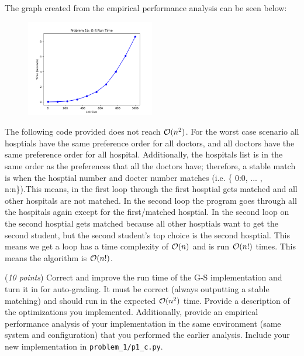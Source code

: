\documentclass{hw}
\begin{document}
\begin{problem}
\begin{solution}
        The graph created from the empirical performance analysis can be seen below:
        \begin{figure}[h]
          \centering
              \includegraphics[width=0.5\textwidth]{figures/problem-1b.png}
        \end{figure}



        The following code provided does not reach $\mathcal{O}(n^2)$. For the worst case scenario all hosptials have the same preference order for all doctors, and all doctors have the same preference order for all hospital. Additionally, the hospitals list is in the same order as the preferences that all the doctors have; therefore, a stable match is when the hosptial number and docter number matches (i.e. \{ 0:0, ... , n:n\}).This means, in the first loop through the first hosptial gets matched and all other hospitals are not matched. In the second loop the program goes through all the hospitals again except for the first/matched hosptial. In the second loop on the second hosptial gets matched because all other hosptials want to get the second student, but the second student's top choice is the second hosptial. This means we get a loop has a time complexity of $\mathcal{O}(n)$ and is run $\mathcal{O}(n!)$ times. This means the algorithm is $\mathcal{O}(n!)$.  
    \end{solution}

    \begin{subproblem}
    \newcommand{\worstrank}{{\tt wr}}
    (\textit{10 points})
    Correct and improve the run time of the G-S implementation and turn it in for
      auto-grading. It must be correct (always outputting a stable matching) and should run in the expected $\mathcal{O}(n^2)$ time. 
      Provide a description of the optimizations you implemented.
      Additionally, provide an empirical performance analysis of your
      implementation in the same environment (same system and configuration) that
      you performed the earlier analysis. Include your new implementation in \texttt{problem\_1/p1\_c.py}.
    \end{subproblem}


\end{problem}
\end{document}
